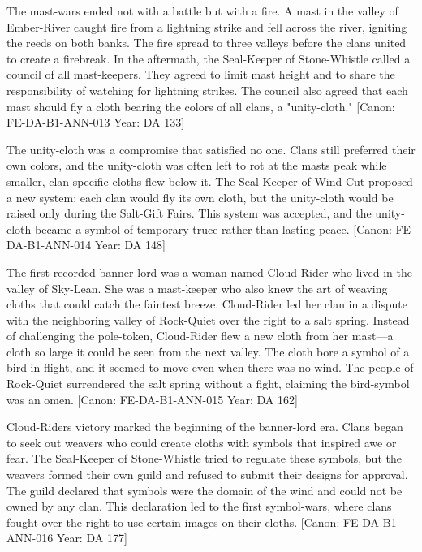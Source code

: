 The mast-wars ended not with a battle but with a fire. A mast in the
valley of Ember-River caught fire from a lightning strike and fell
across the river, igniting the reeds on both banks. The fire spread to
three valleys before the clans united to create a firebreak. In the
aftermath, the Seal-Keeper of Stone-Whistle called a council of all
mast-keepers. They agreed to limit mast height and to share the
responsibility of watching for lightning strikes. The council also
agreed that each mast should fly a cloth bearing the colors of all
clans, a "unity-cloth." {[}Canon: FE-DA-B1-ANN-013 \textbar{} Year: DA
133{]}

The unity-cloth was a compromise that satisfied no one. Clans still
preferred their own colors, and the unity-cloth was often left to rot at
the mast\textquotesingle s peak while smaller, clan-specific cloths flew
below it. The Seal-Keeper of Wind-Cut proposed a new system: each clan
would fly its own cloth, but the unity-cloth would be raised only during
the Salt-Gift Fairs. This system was accepted, and the unity-cloth
became a symbol of temporary truce rather than lasting peace. {[}Canon:
FE-DA-B1-ANN-014 \textbar{} Year: DA 148{]}

The first recorded banner-lord was a woman named Cloud-Rider who lived
in the valley of Sky-Lean. She was a mast-keeper who also knew the art
of weaving cloths that could catch the faintest breeze. Cloud-Rider led
her clan in a dispute with the neighboring valley of Rock-Quiet over the
right to a salt spring. Instead of challenging the pole-token,
Cloud-Rider flew a new cloth from her mast---a cloth so large it could
be seen from the next valley. The cloth bore a symbol of a bird in
flight, and it seemed to move even when there was no wind. The people of
Rock-Quiet surrendered the salt spring without a fight, claiming the
bird-symbol was an omen. {[}Canon: FE-DA-B1-ANN-015 \textbar{} Year: DA
162{]}

Cloud-Rider\textquotesingle s victory marked the beginning of the
banner-lord era. Clans began to seek out weavers who could create cloths
with symbols that inspired awe or fear. The Seal-Keeper of Stone-Whistle
tried to regulate these symbols, but the weavers formed their own guild
and refused to submit their designs for approval. The guild declared
that symbols were the domain of the wind and could not be owned by any
clan. This declaration led to the first symbol-wars, where clans fought
over the right to use certain images on their cloths. {[}Canon:
FE-DA-B1-ANN-016 \textbar{} Year: DA 177{]}

